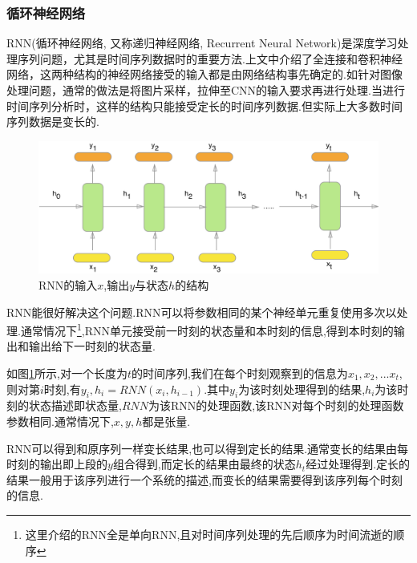 \subsubsection{循环神经网络}
RNN(循环神经网络, 又称递归神经网络, Recurrent Neural Network)是深度学习处理序列问题，尤其是时间序列数据时的重要方法.上文中介绍了全连接和卷积神经网络，这两种结构的神经网络接受的输入都是由网络结构事先确定的.如针对图像处理问题，通常的做法是将图片采样，拉伸至CNN的输入要求再进行处理.当进行时间序列分析时，这样的结构只能接受定长的时间序列数据.但实际上大多数时间序列数据是变长的.
\par
\begin{figure}[htbp!]
    \centering
    \includegraphics[width = 1.\textwidth]{chap/img/rnn.png}
    \caption{
        RNN的输入$x$,输出$y$与状态$h$的结构\supercite{how_rnn_work}
        }\label{fig:rnn}
\end{figure}
\par
RNN能很好解决这个问题.RNN可以将参数相同的某个神经单元重复使用多次以处理.通常情况下\footnote{这里介绍的RNN全是单向RNN,且对时间序列处理的先后顺序为时间流逝的顺序},RNN单元接受前一时刻的状态量和本时刻的信息,得到本时刻的输出和输出给下一时刻的状态量.
\par
如图\ref{fig:rnn}所示,对一个长度为$t$的时间序列,我们在每个时刻观察到的信息为$x_1, x_2, ...x_t$,则对第$i$时刻,有$y_i,h_i = RNN(x_i, h_{i-1})$.其中$y_i$为该时刻处理得到的结果,$h_i$为该时刻的状态描述即状态量,$RNN$为该RNN的处理函数,该RNN对每个时刻的处理函数参数相同.通常情况下,$x,y,h$都是张量.
\par
RNN可以得到和原序列一样变长结果,也可以得到定长的结果.通常变长的结果由每时刻的输出即上段的$y$组合得到,而定长的结果由最终的状态$h_t$经过处理得到.定长的结果一般用于该序列进行一个系统的描述,而变长的结果需要得到该序列每个时刻的信息.
\par

